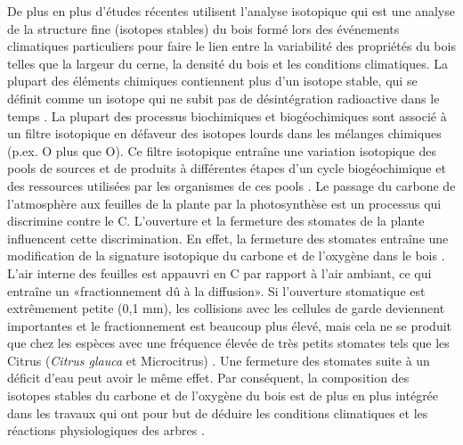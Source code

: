 \documentclass{report}
\begin{document}
De plus en plus d'études récentes utilisent l'analyse isotopique qui est une analyse de la structure fine (isotopes stables) du bois formé lors des événements climatiques particuliers pour faire le lien entre la variabilité des propriétés du bois telles que la largeur du cerne, la densité du bois et les conditions climatiques. La plupart des éléments chimiques contiennent plus d'un isotope stable, qui se définit comme un isotope qui ne subit pas de désintégration radioactive dans le temps \citep{West2006}. La plupart des processus biochimiques et biogéochimiques sont associé à un filtre isotopique en défaveur des isotopes lourds dans les mélanges chimiques (p.ex. O plus que O). Ce filtre isotopique entraîne une variation isotopique des pools de sources et de produits à différentes étapes d'un cycle biogéochimique et des ressources utilisées par les organismes de ces pools \citep{Dawson2002}. Le passage du carbone de l'atmosphère aux feuilles de la plante par la photosynthèse est un processus qui discrimine contre le C. L'ouverture et la fermeture des stomates de la plante influencent cette discrimination. En effet, la fermeture des stomates entraîne une modification de la signature isotopique du carbone et de l'oxygène dans le bois \citep{Farquhar1993, Bigras2005}.
L'air interne des feuilles est appauvri en C par rapport à l'air ambiant, ce qui entraîne un «fractionnement dû à la diffusion». Si l'ouverture stomatique est extrêmement petite (0,1 mm), les collisions avec les cellules de garde deviennent importantes et le fractionnement est beaucoup plus élevé, mais cela ne se produit que chez les espèces avec une fréquence élevée de très petits stomates tels que les Citrus (\textit{Citrus glauca} et Microcitrus) \citep{Farquhar1993}. Une fermeture des stomates suite à un déficit d'eau peut avoir le même effet. Par conséquent, la composition des isotopes stables du carbone et de l'oxygène du bois est de plus en plus intégrée dans les travaux qui ont pour but de déduire les conditions climatiques et les réactions physiologiques des arbres \citep{McCarroll2004, Sternberg2009,Sarris2013}. \\
\end{document}
